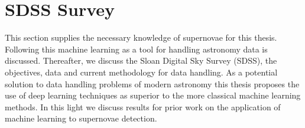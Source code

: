 \section{SDSS Survey}
This section supplies the necessary knowledge of supernovae for this thesis.
Following this machine learning as a tool for handling astronomy data is discussed.
Thereafter, we discuss the Sloan Digital Sky Survey (SDSS), the objectives, data and current methodology for data handling.
As a potential solution to data handling problems of modern astronomy this thesis proposes the use of deep learning techniques as superior to the more classical machine learning methods.
In this light we discuss results for prior work on the application of machine learning to supernovae detection.



